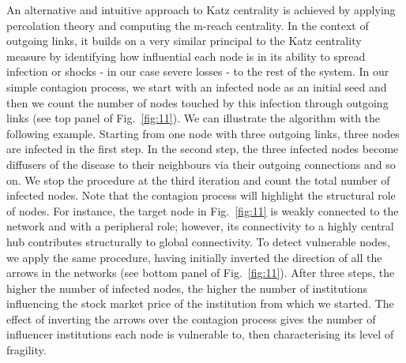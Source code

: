 \documentclass[a4paper,10pt]{article}
\begin{document}
An alternative and  intuitive approach to Katz centrality is achieved by applying percolation theory and computing the m-reach
centrality. In the context of outgoing links, it builds on a very similar principal to the Katz centrality measure by 
identifying how   influential each node is in its ability to spread infection or shocks -  in our case severe losses -  to 
the rest of the system. In our simple contagion process, we start with an infected node as an initial seed and then we count 
the number of nodes touched by this infection through outgoing links (see top panel of Fig.~\ref{fig:11}). We can illustrate
the algorithm with the following example. Starting from one node with three outgoing links, three nodes are infected in the 
first step. In the second step, the three infected nodes become diffusers of the disease to their neighbours via their 
outgoing connections and so on. We stop the procedure at the third iteration and count the total number of infected nodes. 
Note that the contagion process will highlight the structural role of nodes. For instance, the target node in 
Fig.~\ref{fig:11} is weakly connected to the network and with a peripheral role; however, its connectivity to a highly central
hub contributes structurally to global connectivity. To detect vulnerable nodes, we apply the same procedure, having initially 
inverted the direction of all the arrows in the networks (see bottom panel of Fig.~\ref{fig:11}). After three steps, the
higher the number of infected nodes, the higher the number of institutions influencing the stock market price of the 
institution from which we started. The effect of inverting the arrows over the contagion process gives the number of 
influencer institutions each node is vulnerable to, then characterising its level of fragility. 
\end{document}
